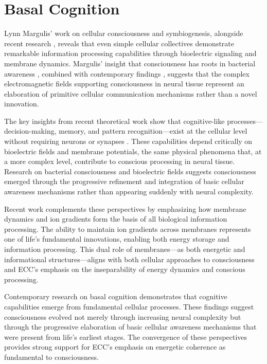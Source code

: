 \section{Basal Cognition}

Lynn Margulis' work on cellular consciousness and symbiogenesis, alongside recent research \cite{Lyon2015}, reveals that even simple cellular collectives demonstrate remarkable information processing capabilities through bioelectric signaling and membrane dynamics. Margulis' insight that consciousness has roots in bacterial awareness \cite{Margulis2001}, combined with contemporary findings \cite{Baluska2016}, suggests that the complex electromagnetic fields supporting consciousness in neural tissue represent an elaboration of primitive cellular communication mechanisms rather than a novel innovation.

The key insights from recent theoretical work show that cognitive-like processes—decision-making, memory, and pattern recognition—exist at the cellular level without requiring neurons or synapses \cite{Shapiro2007}. These capabilities depend critically on bioelectric fields and membrane potentials, the same physical phenomena that, at a more complex level, contribute to conscious processing in neural tissue. Research on bacterial consciousness \cite{vanDuijn2006} and bioelectric fields suggests consciousness emerged through the progressive refinement and integration of basic cellular awareness mechanisms rather than appearing suddenly with neural complexity.

Recent work \cite{Lane2015} complements these perspectives by emphasizing how membrane dynamics and ion gradients form the basis of all biological information processing. The ability to maintain ion gradients across membranes represents one of life's fundamental innovations, enabling both energy storage and information processing. This dual role of membranes—as both energetic and informational structures—aligns with both cellular approaches to consciousness and ECC's emphasis on the inseparability of energy dynamics and conscious processing.

Contemporary research on basal cognition \cite{Levin2019} demonstrates that cognitive capabilities emerge from fundamental cellular processes. These findings suggest consciousness evolved not merely through increasing neural complexity but through the progressive elaboration of basic cellular awareness mechanisms that were present from life's earliest stages. The convergence of these perspectives provides strong support for ECC's emphasis on energetic coherence as fundamental to consciousness.

